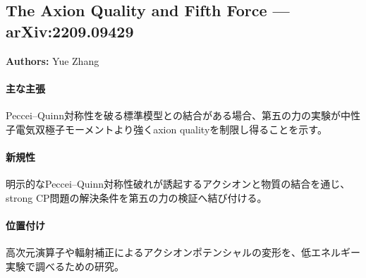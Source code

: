 \subsection{The Axion Quality and Fifth Force --- arXiv:2209.09429}

\textbf{Authors:} Yue Zhang

\paragraph{主な主張}
Peccei--Quinn対称性を破る標準模型との結合がある場合、第五の力の実験が中性子電気双極子モーメントより強くaxion qualityを制限し得ることを示す\cite{Zhang:2022ykd}。

\paragraph{新規性}
明示的なPeccei--Quinn対称性破れが誘起するアクシオンと物質の結合を通じ、strong CP問題の解決条件を第五の力の検証へ結び付ける。

\paragraph{位置付け}
高次元演算子や輻射補正によるアクシオンポテンシャルの変形を、低エネルギー実験で調べるための研究。
